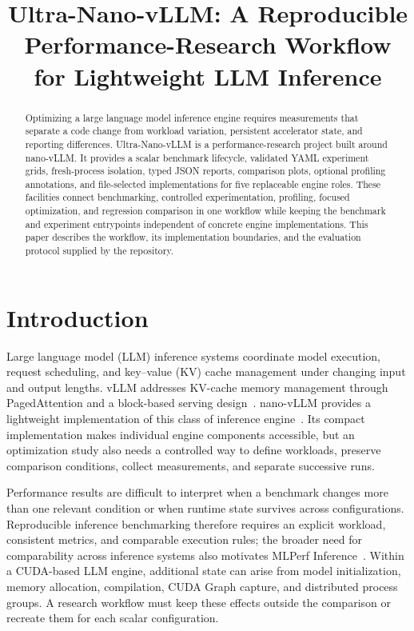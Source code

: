 \documentclass[conference]{IEEEtran}
\begin{document}
\title{Ultra-Nano-vLLM: A Reproducible Performance-Research Workflow for Lightweight LLM Inference}

\author{
}

\maketitle

\begin{abstract}
Optimizing a large language model inference engine requires measurements that
separate a code change from workload variation, persistent accelerator state,
and reporting differences. Ultra-Nano-vLLM is a performance-research project
built around nano-vLLM. It provides a scalar benchmark lifecycle, validated
YAML experiment grids, fresh-process isolation, typed JSON reports, comparison
plots, optional profiling annotations, and file-selected implementations for
five replaceable engine roles. These facilities connect benchmarking,
controlled experimentation, profiling, focused optimization, and regression
comparison in one workflow while keeping the benchmark and experiment
entrypoints independent of concrete engine implementations. This paper
describes the workflow, its implementation boundaries, and the evaluation
protocol supplied by the repository.
\end{abstract}

\section{Introduction}

Large language model (LLM) inference systems coordinate model execution,
request scheduling, and key--value (KV) cache management under changing input
and output lengths. vLLM addresses KV-cache memory management through
PagedAttention and a block-based serving design~\cite{kwon2023vllm}.
nano-vLLM provides a lightweight implementation of this class of inference
engine~\cite{nanovllm}. Its compact implementation makes individual engine
components accessible, but an optimization study also needs a controlled way
to define workloads, preserve comparison conditions, collect measurements, and
separate successive runs.

Performance results are difficult to interpret when a benchmark changes more
than one relevant condition or when runtime state survives across
configurations. Reproducible inference benchmarking therefore requires an
explicit workload, consistent metrics, and comparable execution rules; the
broader need for comparability across inference systems also motivates
MLPerf Inference~\cite{reddi2019mlperf}. Within a CUDA-based LLM engine,
additional state can arise from model initialization, memory allocation,
compilation, CUDA Graph capture, and distributed process groups. A research
workflow must keep these effects outside the comparison or recreate them for
each scalar configuration.
\end{document}
